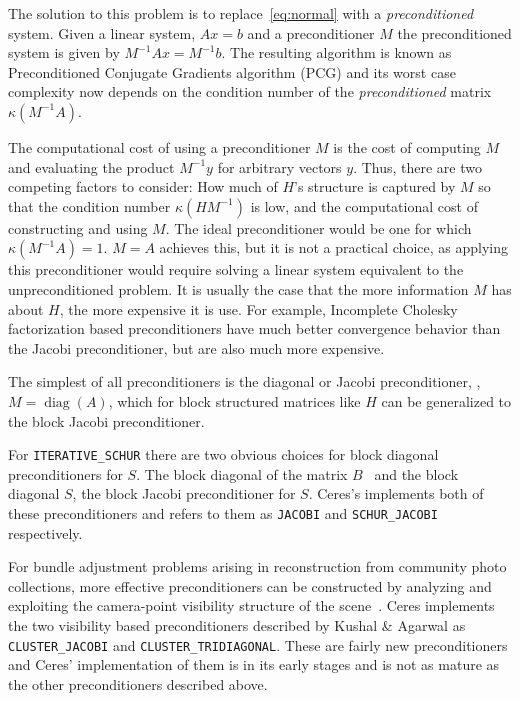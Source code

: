 The solution to this problem is to replace~\eqref{eq:normal} with a {\em preconditioned} system.  Given a linear system, $Ax =b$ and a preconditioner $M$ the preconditioned system is given by $M^{-1}Ax = M^{-1}b$. The resulting algorithm is known as Preconditioned Conjugate Gradients algorithm (PCG) and its  worst case complexity now depends on the condition number of the {\em preconditioned} matrix $\kappa(M^{-1}A)$.

The computational cost of using a preconditioner $M$ is the cost of computing $M$ and evaluating the product $M^{-1}y$ for arbitrary vectors $y$. Thus, there are two competing factors to consider: How much of $H$'s structure is captured by $M$ so that the condition number $\kappa(HM^{-1})$ is low, and the computational cost of constructing and using $M$.  The ideal preconditioner would be one for which $\kappa(M^{-1}A) =1$. $M=A$ achieves this, but it is not a practical choice, as applying this preconditioner would require solving a linear system equivalent to the unpreconditioned problem.  It is usually the case that the more information $M$ has about $H$, the more expensive it is use. For example, Incomplete Cholesky factorization based preconditioners  have much better convergence behavior than the Jacobi preconditioner, but are also much more expensive.


The simplest of all preconditioners is the diagonal or Jacobi preconditioner, \ie,  $M=\operatorname{diag}(A)$, which for block structured matrices like $H$ can be generalized to the block Jacobi preconditioner.

For \texttt{ITERATIVE\_SCHUR} there are two obvious choices for block diagonal preconditioners for $S$. The block diagonal of the matrix $B$~\cite{mandel1990block} and the block diagonal $S$, \ie the block Jacobi preconditioner for $S$. Ceres's implements both of these preconditioners and refers to them as  \texttt{JACOBI} and \texttt{SCHUR\_JACOBI} respectively.

For bundle adjustment problems arising in reconstruction from community photo collections, more effective preconditioners can be constructed by analyzing and exploiting the camera-point visibility structure of the scene~\cite{kushal2012}. Ceres implements the two visibility based preconditioners described by Kushal \& Agarwal as \texttt{CLUSTER\_JACOBI} and \texttt{CLUSTER\_TRIDIAGONAL}. These are fairly new preconditioners and Ceres' implementation of them is in its early stages and is not as mature as the other preconditioners described above.

